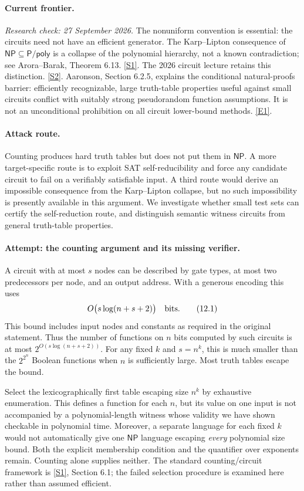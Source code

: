 \documentclass[11pt,a4paper]{article}
\newcommand{\sref}[2]{\hyperlink{source:#1:#2}{[S#2]}}
\newcommand{\eref}[2]{\hyperlink{extra:#1:#2}{[E#2]}}
\begin{document}
\paragraph{Current frontier.}
\textit{Research check: 27 September 2026.}
The nonuniform convention is essential: the circuits need not have an
efficient generator. The Karp--Lipton consequence of
$\mathsf{NP}\subseteq\mathsf{P/poly}$ is a collapse of the polynomial
hierarchy, not a known contradiction; see Arora--Barak, Theorem 6.13.
\sref{30006678}{1}. The 2026 circuit lecture retains this distinction.
\sref{30006678}{2}. Aaronson, Section 6.2.5, explains the conditional natural-proofs
barrier: efficiently recognizable, large truth-table properties useful
against small circuits conflict with suitably strong pseudorandom
function assumptions. It is not an unconditional prohibition on all
circuit lower-bound methods. \eref{30006678}{1}.

\paragraph{Attack route.}
Counting produces hard truth tables but does not put them in $\mathsf{NP}$.
A more target-specific route is to exploit SAT self-reducibility and
force any candidate circuit to fail on a verifiably satisfiable input.
A third route would derive an impossible consequence from the
Karp--Lipton collapse, but no such impossibility is presently available
in this argument. We investigate whether small test sets can certify
the self-reduction route, and distinguish semantic witness circuits
from general truth-table properties.

\paragraph{Attempt: the counting argument and its missing verifier.}
A circuit with at most $s$ nodes can be described by gate types, at most
two predecessors per node, and an output address. With a generous
encoding this uses
\[
 O\bigl(s\log(n+s+2)\bigr)\quad\hbox{bits}. \tag{12.1}
\]
This bound includes input nodes and constants as required in the original
statement. Thus the number of functions on $n$ bits computed by such
circuits is at most $2^{O(s\log(n+s+2))}$. For any fixed $k$ and
$s=n^k$, this is much smaller than the $2^{2^n}$ Boolean functions when
$n$ is sufficiently large. Most truth tables escape the bound.

Select the lexicographically first table escaping size $n^k$ by exhaustive
enumeration. This defines a function for each $n$, but its value on one
input is not accompanied by a polynomial-length witness whose validity
we have shown checkable in polynomial time. Moreover, a separate language
for each fixed $k$ would not automatically give one $\mathsf{NP}$ language
escaping \emph{every} polynomial size bound. Both the explicit membership
condition and the quantifier over exponents remain. Counting alone
supplies neither. The standard counting/circuit framework is
\sref{30006678}{1}, Section 6.1; the failed selection procedure is examined
here rather than assumed efficient.
\end{document}
